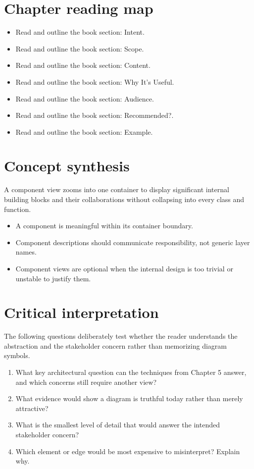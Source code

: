 \documentclass[10pt,letterpaper]{article}
\begin{document}
\section{Chapter reading map}
\begin{itemize}
\item Read and outline the book section: Intent.
\item Read and outline the book section: Scope.
\item Read and outline the book section: Content.
\item Read and outline the book section: Why It’s Useful.
\item Read and outline the book section: Audience.
\item Read and outline the book section: Recommended?.
\item Read and outline the book section: Example.
\end{itemize}

\section{Concept synthesis}
A component view zooms into one container to display significant internal building blocks and their collaborations without collapsing into every class and function.

\begin{itemize}
\item A component is meaningful within its container boundary.
\item Component descriptions should communicate responsibility, not generic layer names.
\item Component views are optional when the internal design is too trivial or unstable to justify them.
\end{itemize}

\section{Critical interpretation}
The following questions deliberately test whether the reader understands the abstraction and the stakeholder concern rather than memorizing diagram symbols.

\begin{enumerate}
\item What key architectural question can the techniques from Chapter 5 answer, and which concerns still require another view?
\item What evidence would show a diagram is truthful today rather than merely attractive?
\item What is the smallest level of detail that would answer the intended stakeholder concern?
\item Which element or edge would be most expensive to misinterpret? Explain why.
\end{enumerate}
\end{document}

